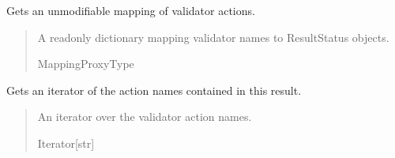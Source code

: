 \documentclass[letterpaper,10pt,english]{sphinxmanual}
\begin{document}
\begin{fulllineitems}
\begin{fulllineitems}
\label{\detokenize{apache_commons_validator_python:apache_commons_validator_python.validator_result_new.ValidatorResult.get_action_map}}
\pysigstartsignatures
{}
\pysigstopsignatures
\sphinxAtStartPar
Gets an unmodifiable mapping of validator actions.
\begin{quote}\begin{description}
\sphinxAtStartPar
A read\sphinxhyphen{}only dictionary mapping validator names to ResultStatus objects.

\sphinxAtStartPar
MappingProxyType

\end{description}\end{quote}

\end{fulllineitems}


\begin{fulllineitems}
\label{\detokenize{apache_commons_validator_python:apache_commons_validator_python.validator_result_new.ValidatorResult.get_actions}}
\pysigstartsignatures
{}
\pysigstopsignatures
\sphinxAtStartPar
Gets an iterator of the action names contained in this result.
\begin{quote}\begin{description}
\sphinxAtStartPar
An iterator over the validator action names.

\sphinxAtStartPar
Iterator{[}str{]}

\end{description}\end{quote}

\end{fulllineitems}



\end{fulllineitems}
\end{document}
